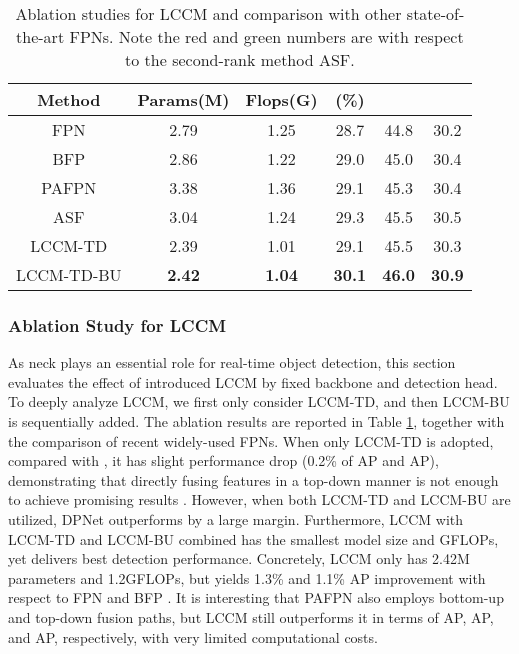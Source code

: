 \documentclass[lettersize,journal]{IEEEtran}
\begin{document}
\begin{table}[t!] 
	\tabcolsep 0.5mm \caption{Ablation studies for LCCM and comparison with other state-of-the-art FPNs. Note the red and green numbers are with respect to the second-rank method ASF\cite{guo2020augfpn}.}
	\begin{center}
		\begin{tabular}{c|c|c|c|c|c}
			\toprule \multirow{1}{*}{Method} &\multirow{1}{*}{Params(M)}  & \multirow{1}{*}{Flops(G)}& \multirow{1}{*}{(\%)}& \multirow{1}{*}{}& \multirow{1}{*}{}\\ \midrule
			FPN\cite{lin2017feature} &2.79 &1.25&28.7&44.8&30.2 \\			
			BFP\cite{pang2019libra} &2.86 &1.22&29.0&45.0&30.4 \\
			PAFPN\cite{tan2020efficientdet} &3.38 &1.36 &29.1 &45.3 &30.4 \\			
			ASF\cite{guo2020augfpn} &3.04 &1.24&29.3&45.5&30.5 \\
\midrule
			LCCM-TD  &2.39 &1.01 &29.1 &45.5 & 30.3\\
			LCCM-TD-BU  &\textbf{2.42} &\textbf{1.04} & \textbf{30.1} & \textbf{46.0} & \textbf{30.9}\\
\bottomrule
		\end{tabular}
	\end{center}\label{tab:LCCM}
\end{table}

\subsubsection{Ablation Study for LCCM}
As neck plays an essential role for real-time object detection, this section evaluates the effect of introduced LCCM by fixed backbone and detection head. To deeply analyze LCCM, we first only consider LCCM-TD, and then LCCM-BU is sequentially added. The ablation results are reported in Table \ref{tab:LCCM}, together with the comparison of recent widely-used FPNs. When only LCCM-TD is adopted, compared with \cite{guo2020augfpn}, it has slight performance drop (0.2\% of AP and AP), demonstrating that directly fusing features in a top-down manner is not enough to achieve promising results \cite{tan2020efficientdet}. However, when both LCCM-TD and LCCM-BU are utilized, DPNet outperforms \cite{guo2020augfpn} by a large margin. Furthermore, LCCM with LCCM-TD and LCCM-BU combined has the smallest model size and GFLOPs, yet delivers best detection performance. Concretely, LCCM only has 2.42M parameters and 1.2GFLOPs, but yields 1.3\% and 1.1\% AP improvement with respect to FPN \cite{lin2017feature} and BFP \cite{pang2019libra}. It is interesting that PAFPN \cite{tan2020efficientdet} also employs bottom-up and top-down fusion paths, but LCCM still outperforms it in terms of AP, AP, and AP, respectively, with very limited computational costs.
\end{document}
